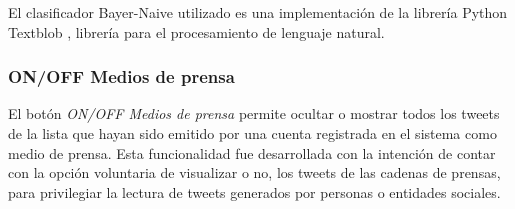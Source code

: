 El clasificador Bayer-Naive utilizado es una implementación de la librería Python Textblob \cite{textblobWebsite}, librería para el procesamiento de lenguaje natural.

	



	



\subsubsection{ON/OFF Medios de prensa}
El botón \emph{ON/OFF Medios de prensa} permite ocultar o mostrar todos los tweets de la lista que hayan sido emitido por una cuenta registrada en el sistema como medio de prensa. Esta funcionalidad fue desarrollada con la intención de contar con la opción voluntaria de visualizar o no, los tweets de las cadenas de prensas, para privilegiar la lectura de tweets generados por personas o entidades sociales.
